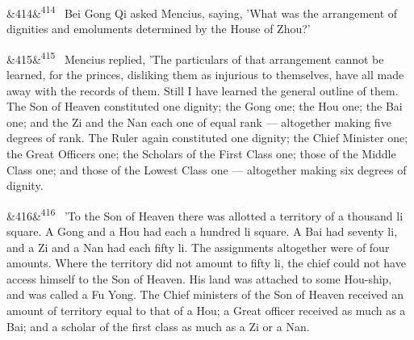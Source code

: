 \documentclass[12pt]{article}
\newcommand{\para}[1][]{\par\noindent\ifx&#1&\else\textsuperscript{\footnotesize #1}~\fi}
\begin{document}
\para[414] Bei Gong Qi asked Mencius, saying, 'What was the arrangement of dignities and emoluments determined by the House of Zhou?'

\para[415] Mencius replied, 'The particulars of that arrangement cannot be learned, for the princes, disliking them as injurious to themselves, have all made away with the records of them. Still I have learned the general outline of them. The Son of Heaven constituted one dignity; the Gong one; the Hou one; the Bai one; and the Zi and the Nan each one of equal rank --- altogether making five degrees of rank. The Ruler again constituted one dignity; the Chief Minister one; the Great Officers one; the Scholars of the First Class one; those of the Middle Class one; and those of the Lowest Class one --- altogether making six degrees of dignity.

\para[416] 'To the Son of Heaven there was allotted a territory of a thousand li square. A Gong and a Hou had each a hundred li square. A Bai had seventy li, and a Zi and a Nan had each fifty li. The assignments altogether were of four amounts. Where the territory did not amount to fifty li, the chief could not have access himself to the Son of Heaven. His land was attached to some Hou-ship, and was called a Fu Yong. The Chief ministers of the Son of Heaven received an amount of territory equal to that of a Hou; a Great officer received as much as a Bai; and a scholar of the first class as much as a Zi or a Nan.
\end{document}

